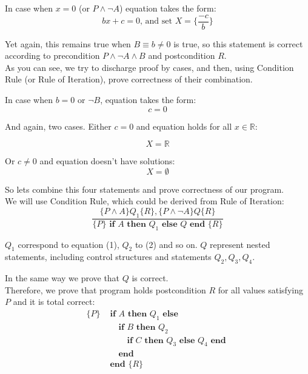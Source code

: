 \documentclass[twoside,twocolumn]{article}
\begin{document}
In case when $x = 0$ (or $P \wedge \neg A$) equation takes the form:
\begin{equation}
  bx + c = 0 \text{, and set } X = \Big\{ \frac{-c}{b} \Big\}
\end{equation}

Yet again, this remains true when $B \equiv b \neq 0$ is true, so this statement
is correct according to precondition $P \wedge \neg A \wedge B$ and
postcondition $R$. \\

As you can see, we try to discharge proof by cases, and then, using Condition
Rule (or Rule of Iteration), prove correctness of their combination.

In case when $b = 0$ or $\neg B$, equation takes the form:
$$ c = 0$$

And again, two cases. Either $c = 0$ and equation holds for all
$x \in \mathbb{R}$:

\begin{equation}
  X = \mathbb{R}
\end{equation}

Or $c \neq 0$ and equation doesn't have solutions:
\begin{equation}
  X = \emptyset
\end{equation}

So lets combine this four statements and prove correctness of our program. \\

We will use Condition Rule, which could be derived from Rule of Iteration:
$$\frac{\{P \wedge A\} Q_1 \{R\}, \{P \wedge \neg A\} Q \{R\}}
{\{P\} \textbf{ if } A \textbf{ then } Q_1 \textbf{ else } Q \textbf{ end } \{R\}}$$

$Q_1$ correspond to equation (1), $Q_2$ to (2) and so on. $Q$ represent
nested statements, including control structures and statements $Q_2, Q_3, Q_4$.

In the same way we prove that $Q$ is correct.\\

Therefore, we prove that program holds postcondition $R$ for all values
satisfying $P$ and it is total correct:
\begin{align*}
  \{P\} & \textbf{ if } A \textbf{ then } Q_1 \textbf{ else } \\
        & \hspace{1em} \textbf{ if } B \textbf{ then } Q_2 \\
        & \hspace{2em} \textbf{ if } C \textbf{ then } Q_3 \textbf { else } Q_4 \textbf { end } \\
        & \hspace{1em} \textbf{ end }\\
        & \textbf{ end } \{R\}
\end{align*}
\end{document}
